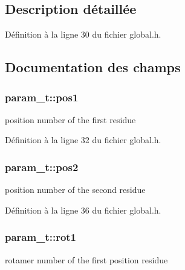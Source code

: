 \subsection{Description détaillée}


Définition à la ligne 30 du fichier global.\+h.



\subsection{Documentation des champs}
\hypertarget{structparam__t_ab8de3cd20605ffa3d31da392b01c6ea0}{
\subsubsection[{pos1}]{ param\+\_\+t\+::pos1}}\label{structparam__t_ab8de3cd20605ffa3d31da392b01c6ea0}


position number of the first residue 



Définition à la ligne 32 du fichier global.\+h.

\hypertarget{structparam__t_a349b644f86af0b2fe512e90404173c2e}{
\subsubsection[{pos2}]{ param\+\_\+t\+::pos2}}\label{structparam__t_a349b644f86af0b2fe512e90404173c2e}


position number of the second residue 



Définition à la ligne 36 du fichier global.\+h.

\hypertarget{structparam__t_a3fba97c80020a66e299640ba9d78935f}{
\subsubsection[{rot1}]{ param\+\_\+t\+::rot1}}\label{structparam__t_a3fba97c80020a66e299640ba9d78935f}


rotamer number of the first position residue 



